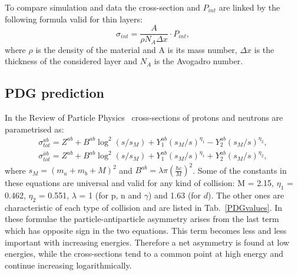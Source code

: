 To compare simulation and data the cross-section and $P_{int}$ are linked by the following formula valid for thin layers:
%
\begin{equation}
\label{sigmaPint}
\sigma_{int} = \frac{A}{\rho N_A \Delta x} \cdot P_{int},
\end{equation}
%
where $\rho$ is the density of the material and A is its mass number, $\Delta x$ is the thickness of the considered layer and $N_A$ is the Avogadro number.

\subsection{PDG prediction}

In the Review of Particle Physics~\cite{PDG2014} cross-sections of protons and neutrons are parametrised as:
%
\begin{align} 
\sigma_{tot}^{ab} = Z^{ab} + B^{ab}\log^2(s/s_M) + Y^{ab}_1(s_M/s)^{\eta_1} - Y^{ab}_2(s_M/s)^{\eta_2}, \\
\sigma^{\bar{a}b}_{tot} = Z^{ab} + B^{ab}\log^2(s/s_M) + Y^{ab}_1(s_M/s)^{\eta_1} + Y^{ab}_2(s_M/s)^{\eta_2},
\end{align}
%
where $s_M = (m_a + m_b + M)^2$ and $B^{ab} = \lambda \pi ( \frac{\hbar c }{M}  )^2$. Some of the constants in these 
equations are universal and valid for any kind of collision: M = 2.15, $\eta_1$ = 0.462, $\eta_2$ = 0.551, $\lambda$ = 1 
(for p, n and $\gamma$) and 1.63 (for $d$). The other ones are characteristic of each type of collision and are listed 
in Tab.~\ref{PDGvalues}. In these formulae the particle-antiparticle asymmetry arises from the last term which has opposite
sign in the two equations. This term becomes less and less important with increasing energies. Therefore a net asymmetry 
is found at low energies, while the cross-sections tend to a common point at high energy and continue increasing logarithmically.
%
\begin{center}
\begin{table}[b]
\centering
{}
\caption{Values for the constants $Z^{ab}$, $Y^{ab}_1$ and $Y^{ab}_2$~\cite{PDG2014}, 
which parametrise hadronic cross-sections. }
\end{table}
\label{PDGvalues}
\end{center}


